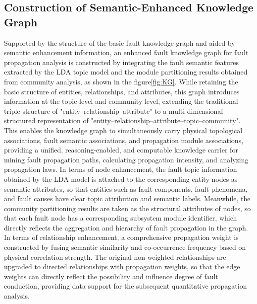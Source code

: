 \documentclass[conference]{IEEEconf}
\begin{document}
\subsection{Construction of Semantic-Enhanced Knowledge Graph}
Supported by the structure of the basic fault knowledge graph and aided by semantic enhancement information, an enhanced fault knowledge graph for fault propagation analysis is constructed by integrating the fault semantic features extracted by the LDA topic model and the module partitioning results obtained from community analysis, as shown in the figure\ref{fig:KG}\cite{paulheim2016knowledge}\cite{chen2024information}. While retaining the basic structure of entities, relationships, and attributes, this graph introduces information at the topic level and community level, extending the traditional triple structure of "entity–relationship–attribute" to a multi-dimensional structured representation of "entity–relationship–attribute–topic–community"\cite{paul2019compact}. This enables the knowledge graph to simultaneously carry physical topological associations, fault semantic associations, and propagation module associations, providing a unified, reasoning-enabled, and computable knowledge carrier for mining fault propagation paths, calculating propagation intensity, and analyzing propagation laws.
In terms of node enhancement, the fault topic information obtained by the LDA model is attached to the corresponding entity nodes as semantic attributes, so that entities such as fault components, fault phenomena, and fault causes have clear topic attribution and semantic labels. Meanwhile, the community partitioning results are taken as the structural attributes of nodes, so that each fault node has a corresponding subsystem module identifier, which directly reflects the aggregation and hierarchy of fault propagation in the graph.
In terms of relationship enhancement, a comprehensive propagation weight is constructed by fusing semantic similarity and co-occurrence frequency based on physical correlation strength. The original non-weighted relationships are upgraded to directed relationships with propagation weights, so that the edge weights can directly reflect the possibility and influence degree of fault conduction, providing data support for the subsequent quantitative propagation analysis.
\end{document}
